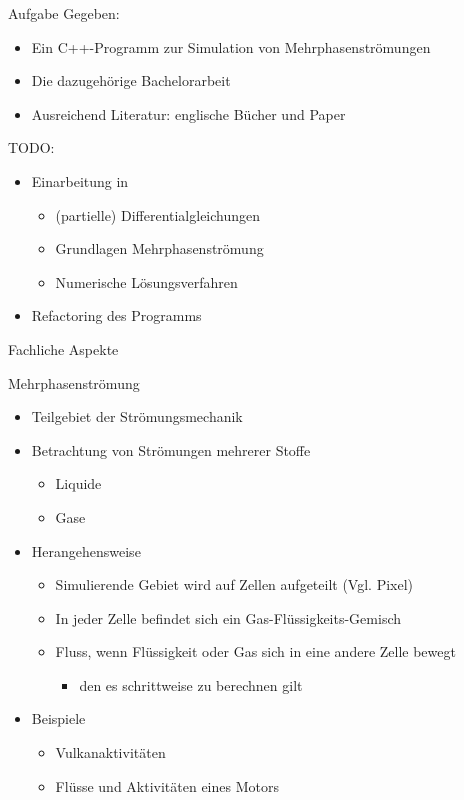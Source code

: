 \documentclass{beamer}           %
\begin{document}
\begin{frame}{Aufgabe}
	Gegeben:
	\begin{itemize}
		\item Ein C++-Programm zur Simulation von Mehrphasenströmungen
		\item Die dazugehörige Bachelorarbeit
		\item Ausreichend Literatur: englische Bücher und Paper
	\end{itemize}
	\pause
	TODO:
	\begin{itemize}
		\item Einarbeitung in
		\begin{itemize}
			\item (partielle) Differentialgleichungen
			\item Grundlagen Mehrphasenströmung
			\item Numerische Lösungsverfahren
		\end{itemize}
		\pause
		\item \alert{Refactoring des Programms}
	\end{itemize}
\end{frame}

\begin{frame}{Fachliche Aspekte}
	\begin{block}{Mehrphasenströmung}
		\begin{itemize}
			\item Teilgebiet der Strömungsmechanik
			\pause
			\item Betrachtung von Strömungen mehrerer Stoffe
			\begin{itemize}
				\item Liquide
				\item Gase
			\end{itemize}
			\pause
			\item Herangehensweise
			\begin{itemize}
				\item Simulierende Gebiet wird auf Zellen aufgeteilt (Vgl. Pixel)
				\pause
				\item In jeder Zelle befindet sich ein Gas-Flüssigkeits-Gemisch
				\pause
				\item Fluss, wenn Flüssigkeit oder Gas sich in eine andere Zelle bewegt
				\begin{itemize}
					\item den es schrittweise zu berechnen gilt
				\end{itemize}
			\end{itemize}
			\pause
			\item Beispiele
			\begin{itemize}
				\item Vulkanaktivitäten
				\item Flüsse und Aktivitäten eines Motors
			\end{itemize}
		\end{itemize}
	\end{block}	
\end{frame}
\end{document}

